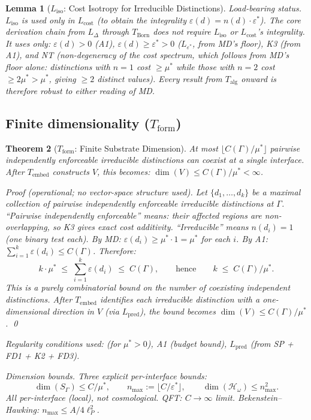 \documentclass[11pt,a4paper]{article}
\newtheorem{theorem}{Theorem}[section]
\newtheorem{lemma}[theorem]{Lemma}
\theoremstyle{definition}
\newcommand{\eps}{\varepsilon}
\begin{document}
\begin{lemma}[$L_{\mathrm{iso}}$: Cost Isotropy for Irreducible Distinctions]
\smallskip\noindent\textit{Load-bearing status.}  $L_{\mathrm{iso}}$ is used only in $L_{\mathrm{cost}}$ (to obtain the integrality $\eps(d) = n(d) \cdot \eps^*$).  The core derivation chain from $L_\Delta$ through $T_{\mathrm{Born}}$ does \emph{not} require $L_{\mathrm{iso}}$ or $L_{\mathrm{cost}}$'s integrality.  It uses only: $\eps(d) > 0$ (A1), $\eps(d) \ge \eps^* > 0$ ($L_{\eps^*}$, from MD's floor), K3 (from A1), and NT (non-degeneracy of the cost spectrum, which follows from MD's floor alone: distinctions with $n = 1$ cost $\ge \mu^*$ while those with $n = 2$ cost $\ge 2\mu^* > \mu^*$, giving $\ge 2$ distinct values).  Every result from $T_{\mathrm{alg}}$ onward is therefore robust to either reading of MD.
\end{lemma}

\subsection{Finite dimensionality ($T_{\mathrm{form}}$)}

\begin{theorem}[$T_{\mathrm{form}}$: Finite Substrate Dimension]\label{thm:Tform}
At most $\lfloor C(\Gamma)/\mu^* \rfloor$ pairwise independently enforceable irreducible distinctions can coexist at a single interface.  After $T_{\mathrm{embed}}$ constructs $V$, this becomes: $\dim(V) \le C(\Gamma)/\mu^* < \infty$.

\noindent\textit{Proof} (operational; no vector-space structure used).  Let $\{d_1, \ldots, d_k\}$ be a maximal collection of pairwise independently enforceable irreducible distinctions at $\Gamma$.  ``Pairwise independently enforceable'' means: their affected regions are non-overlapping, so K3 gives exact cost additivity.  ``Irreducible'' means $n(d_i) = 1$ (one binary test each).  By MD: $\eps(d_i) \ge \mu^* \cdot 1 = \mu^*$ for each $i$.  By A1: $\sum_{i=1}^k \eps(d_i) \le C(\Gamma)$.  Therefore:
\[
k \cdot \mu^* \;\le\; \sum_{i=1}^k \eps(d_i) \;\le\; C(\Gamma), \qquad\text{hence}\qquad k \;\le\; C(\Gamma)/\mu^*.
\]
This is a purely combinatorial bound on the number of coexisting independent distinctions.  After $T_{\mathrm{embed}}$ identifies each irreducible distinction with a one-dimensional direction in $V$ (via $L_{\mathrm{pred}}$), the bound becomes $\dim(V) \le C(\Gamma)/\mu^*$.  \qed

\noindent\textit{Regularity conditions used:}  (for $\mu^* > 0$), A1 (budget bound), $L_{\mathrm{pred}}$ (from SP + FD1 + K2 + FD3).

\noindent\textit{Dimension bounds.}  Three explicit per-interface bounds:
\[
\dim(S_\Gamma) \le C/\mu^*, \qquad n_{\max} := \lfloor C/\eps^* \rfloor, \qquad \dim(\mathcal{H}_\omega) \le n_{\max}^2.
\]
All per-interface (local), not cosmological.  QFT: $C \to \infty$ limit.  Bekenstein--Hawking: $n_{\max} \le A/4\ell_P^2$.
\end{theorem}
\end{document}
